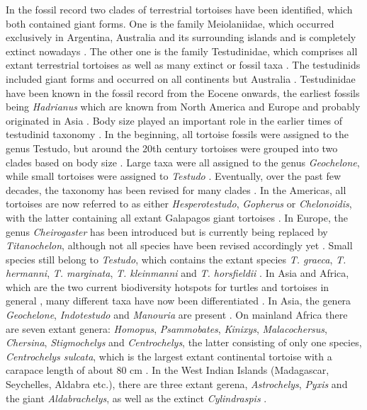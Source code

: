 In the fossil record two clades of terrestrial tortoises have been identified, which both contained giant forms. One is the family Meiolaniidae, which occurred exclusively in Argentina, Australia and its surrounding islands and is completely extinct nowadays \citep{Anderson1025, Sterli2015}. The other one is the family Testudinidae, which comprises all extant terrestrial tortoises as well as many extinct or fossil taxa \citep{.}. The testudinids included giant forms and occurred on all continents but Australia \citep{.}.
Testudinidae have been known in the fossil record from the Eocene onwards, the earliest fossils being \textit{Hadrianus} which are known from North America and Europe and probably originated in Asia \citep{Cope1872}.
Body size played an important role in the earlier times of testudinid taxonomy \citep{.}. In the beginning, all tortoise fossils were assigned to the genus Testudo, but around the 20th century tortoises were grouped into two clades based on body size \citep{.}. Large taxa were all assigned to the genus \textit{Geochelone}, while small tortoises were assigned to \textit{Testudo} \citep{LapparentdeBroin2001}.
Eventually, over the past few decades, the taxonomy has been revised for many clades \citep{.}. In the Americas, all tortoises are now referred to as either \textit{Hesperotestudo}, \textit{Gopherus} or \textit{Chelonoidis}, with the latter containing all extant Galapagos giant tortoises \citep{.}. In Europe, the genus \textit{Cheirogaster} has been introduced but is currently being replaced by \textit{Titanochelon}, although not all species have been revised accordingly yet \citep{.}. Small species still belong to \textit{Testudo}, which contains the extant species \textit{T. graeca}, \textit{T. hermanni}, \textit{T. marginata}, \textit{T. kleinmanni} and \textit{T. horsfieldii} \citep{Fritz2007}.
In Asia and Africa, which are the two current biodiversity hotspots for turtles and tortoises in general \citep{.}, many different taxa have now been differentiated \citep{.}.
In Asia, the genera \textit{Geochelone}, \textit{Indotestudo} and \textit{Manouria} are present \citep{.}. On mainland Africa there are seven extant genera: \textit{Homopus}, \textit{Psammobates}, \textit{Kinixys}, \textit{Malacochersus}, \textit{Chersina}, \textit{Stigmochelys} and \textit{Centrochelys}, the latter consisting of only one species, \textit{Centrochelys sulcata}, which is the largest extant continental tortoise with a carapace length of about 80 cm \citep{.}. In the West Indian Islands (Madagascar, Seychelles, Aldabra etc.), there are three extant gerena, \textit{Astrochelys}, \textit{Pyxis} and the giant \textit{Aldabrachelys}, as well as the extinct \textit{Cylindraspis} \citep{.}.

